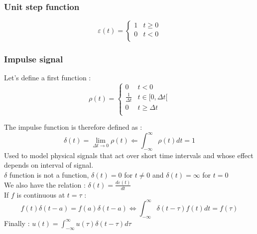 \documentclass[../main.tex]{subfiles}
\begin{document}
\subsubsection{Unit step function}

\begin{equation}
    \varepsilon(t) = \begin{cases}1 & t\geq 0\\ 0& t<0\\ \end{cases}
\end{equation}

\subsubsection{Impulse signal}
Let's define a first function : \\
\begin{equation}
    \rho(t) = \begin{cases}
        0 & t<0\\
        \frac{1}{\Delta t} & t\in [0, \Delta t[\\
        0 & t\geq \Delta t\\
    \end{cases}
\end{equation}

The impulse function is therefore defined as :\\
\begin{equation}
    \delta(t) = \lim_{\Delta t \rightarrow 0} \rho(t) \Leftarrow \int_{-\infty}^\infty \rho(t) dt = 1
\end{equation}
Used to model physical signals that act over short time intervals and whose effect depends on interval of signal.\\

\warning $\delta$ function is not a function, $\delta(t) = 0$ for $t\neq 0$ and $\delta(t) = \infty$ for $t=0$\\

We also have the relation : $\delta(t) = \frac{d\varepsilon(t)}{dt}$\\

If $f$ is continuous at $t=\tau$ :\\
\begin{equation}
    f(t) \delta(t-a) = f(a) \delta(t-a) \Leftrightarrow \int_{-\infty}^\infty \delta(t-\tau) f(t) dt = f(\tau)
\end{equation}
Finally : $u(t) = \int_{-\infty}^\infty u(\tau) \delta(t-\tau)d\tau$\\
\end{document}
